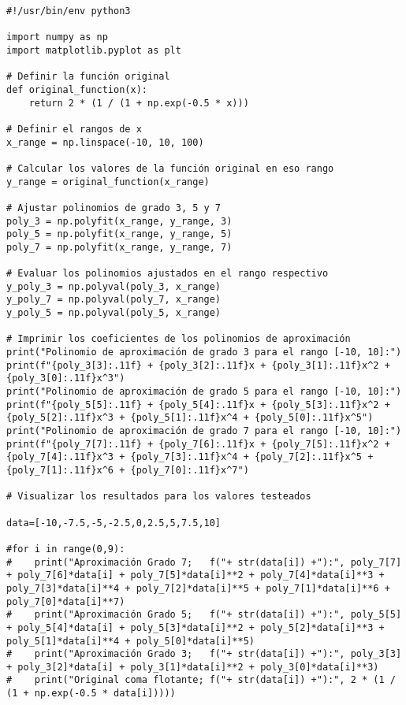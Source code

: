 \begin{code}
\begin{verbatim}
#!/usr/bin/env python3

import numpy as np
import matplotlib.pyplot as plt

# Definir la función original
def original_function(x):
    return 2 * (1 / (1 + np.exp(-0.5 * x)))

# Definir el rangos de x
x_range = np.linspace(-10, 10, 100)

# Calcular los valores de la función original en eso rango
y_range = original_function(x_range)

# Ajustar polinomios de grado 3, 5 y 7
poly_3 = np.polyfit(x_range, y_range, 3)
poly_5 = np.polyfit(x_range, y_range, 5)
poly_7 = np.polyfit(x_range, y_range, 7)

# Evaluar los polinomios ajustados en el rango respectivo
y_poly_3 = np.polyval(poly_3, x_range) 
y_poly_7 = np.polyval(poly_7, x_range)  
y_poly_5 = np.polyval(poly_5, x_range) 

# Imprimir los coeficientes de los polinomios de aproximación
print("Polinomio de aproximación de grado 3 para el rango [-10, 10]:")
print(f"{poly_3[3]:.11f} + {poly_3[2]:.11f}x + {poly_3[1]:.11f}x^2 + {poly_3[0]:.11f}x^3")
print("Polinomio de aproximación de grado 5 para el rango [-10, 10]:")
print(f"{poly_5[5]:.11f} + {poly_5[4]:.11f}x + {poly_5[3]:.11f}x^2 + {poly_5[2]:.11f}x^3 + {poly_5[1]:.11f}x^4 + {poly_5[0]:.11f}x^5")
print("Polinomio de aproximación de grado 7 para el rango [-10, 10]:")
print(f"{poly_7[7]:.11f} + {poly_7[6]:.11f}x + {poly_7[5]:.11f}x^2 + {poly_7[4]:.11f}x^3 + {poly_7[3]:.11f}x^4 + {poly_7[2]:.11f}x^5 + {poly_7[1]:.11f}x^6 + {poly_7[0]:.11f}x^7")

# Visualizar los resultados para los valores testeados

data=[-10,-7.5,-5,-2.5,0,2.5,5,7.5,10]

#for i in range(0,9):
#    print("Aproximación Grado 7;   f("+ str(data[i]) +"):", poly_7[7] + poly_7[6]*data[i] + poly_7[5]*data[i]**2 + poly_7[4]*data[i]**3 + poly_7[3]*data[i]**4 + poly_7[2]*data[i]**5 + poly_7[1]*data[i]**6 + poly_7[0]*data[i]**7)
#    print("Aproximación Grado 5;   f("+ str(data[i]) +"):", poly_5[5] + poly_5[4]*data[i] + poly_5[3]*data[i]**2 + poly_5[2]*data[i]**3 + poly_5[1]*data[i]**4 + poly_5[0]*data[i]**5)
#    print("Aproximación Grado 3;   f("+ str(data[i]) +"):", poly_3[3] + poly_3[2]*data[i] + poly_3[1]*data[i]**2 + poly_3[0]*data[i]**3)
#    print("Original coma flotante; f("+ str(data[i]) +"):", 2 * (1 / (1 + np.exp(-0.5 * data[i]))))


\end{verbatim}
\end{code}
